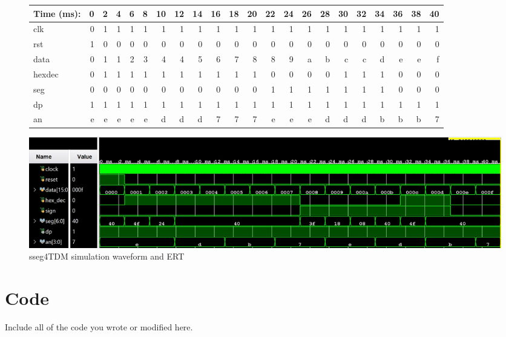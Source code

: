 \documentclass[11pt]{article}
\begin{document}
\begin{figure}[ht]\centering
	\begin{tabular}{l|rrrrrrrrrrrrrrrrrrrrr}
		Time (ms): & 0 & 2 & 4 & 6 & 8  & 10 & 12 & 14 & 16 & 18 & 20 & 22 & 24 & 26 & 28  & 30 & 32 & 34 & 36 & 38 & 40  \\
		\midrule
		clk & 0 & 1 & 1 & 1 & 1 & 1 & 1 & 1 & 1 & 1 & 1 & 1 & 1 & 1 & 1 & 1 & 1 & 1 & 1 & 1 & 1 \\
		rst & 1 & 0 & 0 & 0 & 0 & 0 & 0 & 0 & 0 & 0 & 0 & 0 & 0 & 0 & 0 & 0 & 0 & 0 & 0 & 0 & 0 \\
		data & 0 & 1 & 1 & 2 & 3 & 4 & 4 & 5 & 6 & 7 & 8 & 8 & 9 & a & b & c & c & d & e & e & f\\
		hexdec & 0 & 1 & 1 & 1 & 1 & 1 & 1 & 1 & 1 & 1 & 1 & 0 & 0 & 0 & 0 & 1 & 1 & 1 & 0 & 0 & 0 \\
		\midrule
		seg & 0 & 0 & 0 & 0 & 0 & 0 & 0 & 0 & 0 & 0 & 0 & 1 & 1 & 1 & 1 & 1 & 1 & 1 & 0 & 0 & 0\\
		dp & 1 & 1 & 1 & 1 & 1 & 1 & 1 & 1 & 1 & 1 & 1 & 1 & 1 & 1 & 1 & 1 & 1 & 1 & 1 & 1 & 1\\
		an & e & e & e & e & e & d & d & d & 7 & 7 & 7 & e & e & e & d & d & d & b & b & b & 7\\
		\bottomrule
	\end{tabular}\medskip
	
	\includegraphics[width=1.15 \textwidth]{sseg4_TDM_Test.JPG}
	\caption{sseg4TDM simulation waveform and ERT}
	\label{fig:sim_with_table}
\end{figure}

\section*{Code}

Include all of the code you wrote or modified here.
\end{document}
